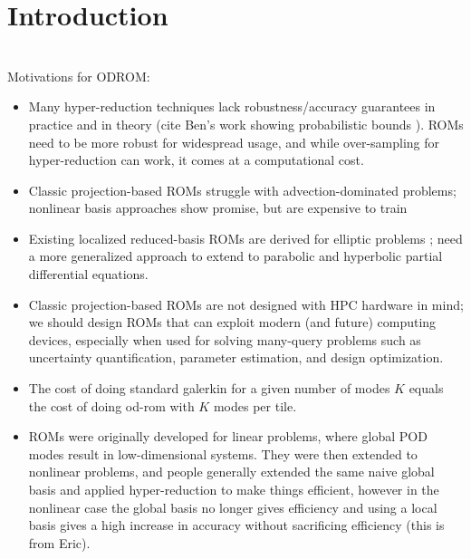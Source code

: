 
\section{Introduction} \label{sec:intro}

 \\

Motivations for ODROM:

\begin{itemize}
\item Many hyper-reduction techniques lack robustness/accuracy guarantees in practice and in theory (cite Ben's work showing probabilistic bounds \cite{peherstorfer2020stability}). ROMs need to be more robust for widespread usage, and while over-sampling for hyper-reduction can work, it comes at a computational cost.
\item Classic projection-based ROMs struggle with advection-dominated problems; nonlinear basis approaches show promise, but are expensive to train
\item Existing localized reduced-basis ROMs are derived for elliptic problems \cite{ohlberger2015error,antonietti2016discontinuous}; need a more generalized approach to extend to parabolic and hyperbolic partial differential equations.
\item Classic projection-based ROMs are not designed with HPC hardware in mind; we should design ROMs that can exploit modern (and future) computing devices, especially when used for solving many-query problems such as uncertainty quantification, parameter estimation, and design optimization.
\item The cost of doing standard galerkin for a given number of modes $K$ equals the cost of doing od-rom with $K$ modes per tile.
  \item ROMs were originally developed for linear problems, where global POD modes result in low-dimensional systems. They were then extended to nonlinear problems, and people generally extended the same naive global basis and applied hyper-reduction to make things efficient, however in the nonlinear case the global basis no longer gives efficiency and using a local basis gives a high increase in accuracy without sacrificing efficiency (this is from Eric).
\end{itemize}

 \\

